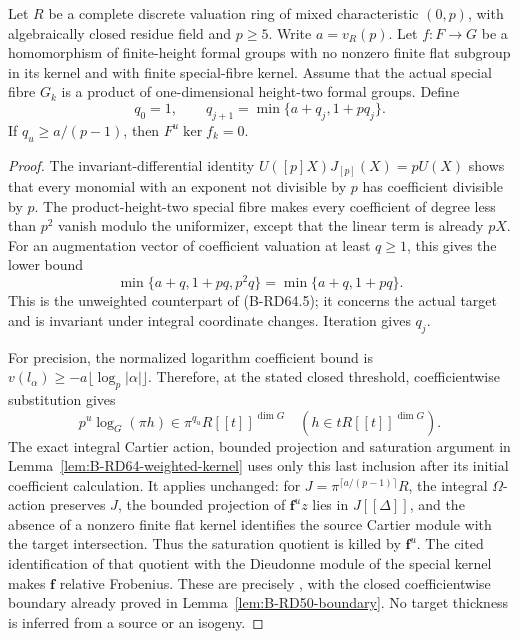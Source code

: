 \begin{lemma}
\label{lem:B-RD77-kernel}
Let \(R\) be a complete discrete valuation ring of mixed
characteristic \((0,p)\), with algebraically closed residue
field and \(p\ge5\). Write \(a=v_R(p)\). Let \(f:F\to G\)
be a homomorphism of finite-height formal groups with no nonzero
finite flat subgroup in its kernel and with finite special-fibre
kernel. Assume that the actual special fibre \(G_k\) is a product
of one-dimensional height-two formal groups. Define
\[
 q_0=1,\qquad q_{j+1}=\min\{a+q_j,1+pq_j\}.
                                                        \tag{B-RD77.1}
\]
If \(q_u\ge a/(p-1)\), then \(F^u\ker f_k=0\).
\end{lemma}
\begin{proof}
The invariant-differential identity
\(U([p]X)J_{[p]}(X)=pU(X)\) shows that every monomial with
an exponent not divisible by \(p\) has coefficient divisible
by \(p\). The product-height-two special fibre makes every
coefficient of degree less than \(p^2\) vanish modulo the
uniformizer, except that the linear term is already \(pX\).
For an augmentation vector of coefficient valuation at least
\(q\ge1\), this gives the lower bound
\[
 \min\{a+q,1+pq,p^2q\}
       =\min\{a+q,1+pq\}.                             \tag{B-RD77.2}
\]
This is the unweighted counterpart of (B-RD64.5); it concerns
the actual target and is invariant under integral coordinate
changes. Iteration gives \(q_j\).

For precision, the normalized logarithm coefficient bound is
\(v(l_\alpha)\ge-a\lfloor\log_p|\alpha|\rfloor\).
Therefore, at the stated closed threshold, coefficientwise
substitution gives
\[
       p^u\log_G(\pi h)\in\pi^{q_u}R[[t]]^{\dim G}
       \quad(h\in tR[[t]]^{\dim G}).                  \tag{B-RD77.3}
\]
The exact integral Cartier action, bounded projection and
saturation argument in Lemma~\ref{lem:B-RD64-weighted-kernel}
uses only this last inclusion after its initial coefficient
calculation. It applies unchanged: for
\(J=\pi^{\lceil a/(p-1)\rceil}R\), the integral
\(\Omega\)-action preserves \(J\), the bounded projection
of \(\mathbf f^u z\) lies in \(J[[\Delta]]\), and the
absence of a nonzero finite flat kernel identifies the source
Cartier module with the target intersection. Thus the saturation
quotient is killed by \(\mathbf f^u\). The cited identification
of that quotient with the Dieudonne module of the special kernel
makes \(\mathbf f\) relative Frobenius. These are precisely
\cite[Propositions~9--12 and Lemma~3, pp.~674--676;
Proposition~16 and proof, p.~681; Theorem~2(8), p.~668]
{Bondarko2006Generic}, with the closed coefficientwise boundary
already proved in Lemma~\ref{lem:B-RD50-boundary}.
No target thickness is inferred from a source or an isogeny.
\end{proof}

